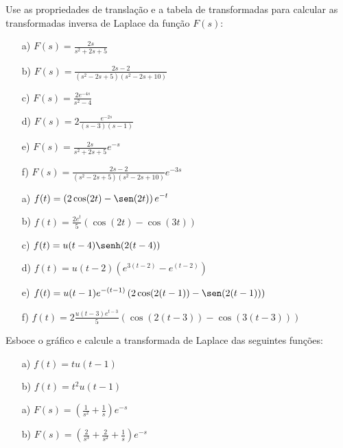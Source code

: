  \begin{exer}Use as propriedades de translação e a tabela de transformadas para calcular as transformadas inversa de Laplace da função $F(s)$:
 \begin{itemize}
  \item[a)] $\displaystyle F(s)=\frac{2s}{s^2+2s+5}$
    \item[b)] $\displaystyle F(s)=\frac{2s-2}{(s^2-2s+5)(s^2-2s+10)}$
  \item[c)] $\displaystyle F(s)=\frac{2e^{-4s}}{s^2-4}$
    \item[d)] $\displaystyle F(s)=2\frac{e^{-2s}}{(s-3)(s-1)}$
    \item[e)] $\displaystyle F(s)=\frac{2s}{s^2+2s+5}e^{-s}$
    \item[f)] $\displaystyle F(s)=\frac{2s-2}{(s^2-2s+5)(s^2-2s+10)}e^{-3s}$
 \end{itemize}
\end{exer}
\begin{resp}
\begin{itemize}
  \item[a)] $\displaystyle f(t)=\left(2\cos(2t)-\sen(2t)\right)e^{-t}$ 
      \item[b)] $\displaystyle f(t)=\frac{2e^{t}}{5}\left(\cos(2t)-\cos(3t)\right)$ 
        \item[c)] $\displaystyle f(t)=u(t-4)\senh(2(t-4))$ 
      \item[d)] $\displaystyle f(t)=u(t-2)\left(e^{3(t-2)}-e^{(t-2)}\right)$ 
        \item[e)] $\displaystyle f(t)=u(t-1)e^{-(t-1)}\left(2\cos(2(t-1))-\sen(2(t-1))\right)$ 
      \item[f)] $\displaystyle f(t)=2\frac{u(t-3)e^{t-3}}{5}\left(\cos(2(t-3))-\cos(3(t-3))\right)$ 
 \end{itemize}
\end{resp}
\begin{exer}Esboce o gráfico e calcule a transformada de Laplace das seguintes funções:
 \begin{itemize}
  \item[a)] $f(t)=tu(t-1)$
  \item[b)] $f(t)=t^2u(t-1)$
 \end{itemize}
\end{exer}
\begin{resp}
 \begin{itemize}
  \item[a)] $F(s)=\left(\frac{1}{s^2}+\frac{1}{s}\right)e^{-s}$
      \item[b)] $F(s)=\left(\frac{2}{s^3}+\frac{2}{s^2}+\frac{1}{s}\right)e^{-s}$
 \end{itemize}
\end{resp}
